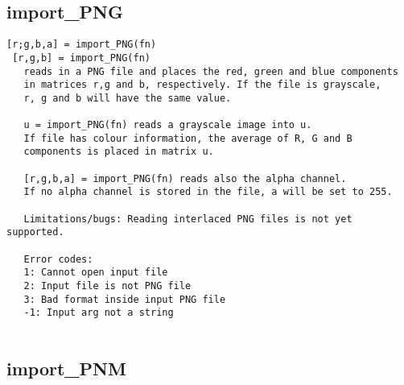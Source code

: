 \documentclass[a4paper]{article}
\begin{document}
\subsection{import\_PNG\label{import_PNG}}

\begin{tscreen}
\begin{verbatim}
[r;g,b,a] = import_PNG(fn)
 [r,g,b] = import_PNG(fn)
   reads in a PNG file and places the red, green and blue components
   in matrices r,g and b, respectively. If the file is grayscale,
   r, g and b will have the same value.

   u = import_PNG(fn) reads a grayscale image into u.
   If file has colour information, the average of R, G and B
   components is placed in matrix u.

   [r,g,b,a] = import_PNG(fn) reads also the alpha channel.
   If no alpha channel is stored in the file, a will be set to 255.

   Limitations/bugs: Reading interlaced PNG files is not yet supported.
   
   Error codes:
   1: Cannot open input file
   2: Input file is not PNG file
   3: Bad format inside input PNG file
   -1: Input arg not a string
 
\end{verbatim}
\end{tscreen}



\subsection{import\_PNM\label{import_PNM}}
\end{document}
